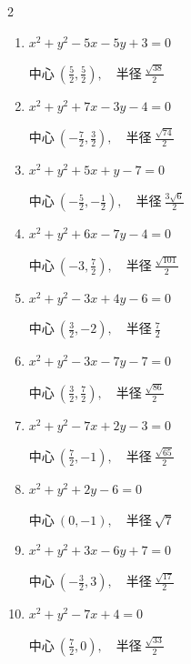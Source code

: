 \begin{multicols}{2}
\begin{enumerate}
  \itemsep=3pt
  \item $x^{2}+y^{2}-5x-5y+3=0$

        $\displaystyle 中心\: \left(\frac{5}{2},\frac{5}{2}\right), \quad 半径 \ \frac{\sqrt{38}}{2}$

  \item $x^{2}+y^{2}+7x-3y-4=0$

        $\displaystyle 中心\: \left(-\frac{7}{2},\frac{3}{2}\right), \quad 半径 \ \frac{\sqrt{74}}{2}$

  \item $x^{2}+y^{2}+5x+y-7=0$

        $\displaystyle 中心\: \left(-\frac{5}{2},-\frac{1}{2}\right), \quad 半径 \ \frac{3\sqrt{6}}{2}$

  \item $x^{2}+y^{2}+6x-7y-4=0$

        $\displaystyle 中心\: \left(-3,\frac{7}{2}\right), \quad 半径 \ \frac{\sqrt{101}}{2}$

  \item $x^{2}+y^{2}-3x+4y-6=0$

        $\displaystyle 中心\: \left(\frac{3}{2},-2\right), \quad 半径 \ \frac{7}{2}$

  \item $x^{2}+y^{2}-3x-7y-7=0$

        $\displaystyle 中心\: \left(\frac{3}{2},\frac{7}{2}\right), \quad 半径 \ \frac{\sqrt{86}}{2}$

  \item $x^{2}+y^{2}-7x+2y-3=0$

        $\displaystyle 中心\: \left(\frac{7}{2},-1\right), \quad 半径 \ \frac{\sqrt{65}}{2}$

  \item $x^{2}+y^{2}+2y-6=0$

        $\displaystyle 中心\: \left(0,-1\right), \quad 半径 \ \sqrt{7}$

  \item $x^{2}+y^{2}+3x-6y+7=0$

        $\displaystyle 中心\: \left(-\frac{3}{2},3\right), \quad 半径 \ \frac{\sqrt{17}}{2}$

  \item $x^{2}+y^{2}-7x+4=0$

        $\displaystyle 中心\: \left(\frac{7}{2},0\right), \quad 半径 \ \frac{\sqrt{33}}{2}$


\end{enumerate}
\end{multicols}
